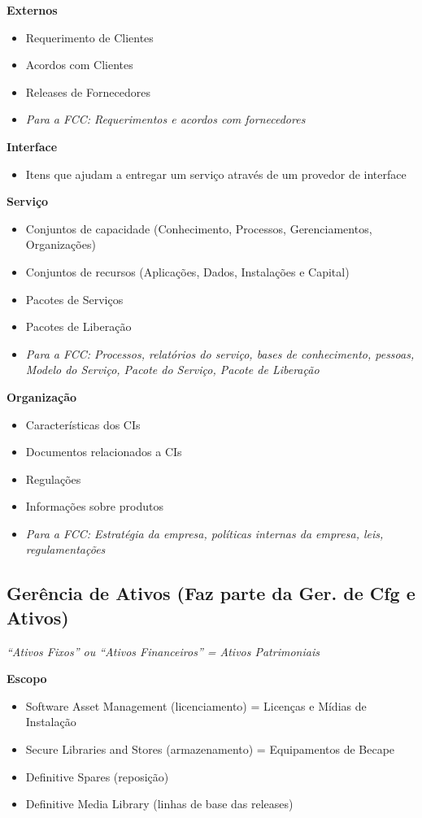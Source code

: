 \textbf{Externos}
\begin{itemize}
	\item Requerimento de Clientes
	\item Acordos com Clientes
	\item Releases de Fornecedores
	\item \emph{Para a FCC: Requerimentos e acordos com fornecedores} 
\end{itemize}


\textbf{Interface}
\begin{itemize}
	\item Itens que ajudam a entregar um serviço através de um provedor de interface
\end{itemize}

\textbf{Serviço}
\begin{itemize}
	\item Conjuntos de capacidade (Conhecimento, Processos, Gerenciamentos, Organizações)
	\item Conjuntos de recursos (Aplicações, Dados, Instalações e Capital)
	\item Pacotes de Serviços
	\item Pacotes de Liberação
	\item \emph{Para a FCC: Processos, relatórios do serviço, bases de conhecimento, pessoas, Modelo do Serviço, Pacote do Serviço, Pacote de Liberação} 
\end{itemize}


\textbf{Organização}
\begin{itemize}
	\item Características dos CIs
	\item Documentos relacionados a CIs
	\item Regulações
	\item Informações sobre produtos
	\item \emph{Para a FCC: Estratégia da empresa, políticas internas da empresa, leis, regulamentações} 
\end{itemize}

\subsection{Gerência de Ativos (Faz parte da Ger. de Cfg e Ativos)}

\begin{center}
	\emph{“Ativos Fixos” ou “Ativos Financeiros” = Ativos Patrimoniais}
\end{center}

\textbf{Escopo}
\begin{itemize}
	\item Software Asset Management (licenciamento) = Licenças e Mídias de Instalação
	\item Secure Libraries and Stores (armazenamento) = Equipamentos de Becape
	\item Definitive Spares (reposição)
	\item Definitive Media Library (linhas de base das releases)
\end{itemize}


